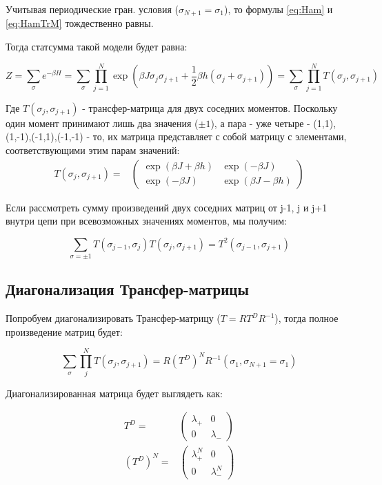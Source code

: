 \documentclass{article}
\newcommand{\bj}{\beta J}
\newcommand{\bh}{\beta h}
\newcommand{\lp}{\lambda_{+}}
\newcommand{\lm}{\lambda_{-}}
\numberwithin{equation}{section}
\begin{document}
Учитывая периодические гран. условия ($\sigma_{N+1} = \sigma_{1}$), то формулы \eqref{eq:Ham} и \eqref{eq:HamTrM} тождественно равны.

Тогда статсумма такой модели будет равна:

\begin{equation}\label{ZTrM}
    Z = \sum_{\sigma} e^{-\beta H} = \sum_{\sigma} \prod_{j=1}^{N} \exp{(\bj\sigma_{j}\sigma_{j+1} + \frac{1}{2}\bh(\sigma_{j} + \sigma_{j+1}))} = \sum_{\sigma} \prod_{j=1}^{N} T(\sigma_{j}, \sigma_{j+1})
\end{equation}
    
Где $T(\sigma_{j}, \sigma_{j+1})$ - трансфер-матрица для двух соседних моментов. Поскольку один момент принимают лишь два значения ($\pm1$), а пара - уже четыре - (1,1),(1,-1),(-1,1),(-1,-1) - то, их матрица представляет с собой матрицу с элементами, соответствующими этим парам значений:
\begin{align}\label{TrM}
  T(\sigma_{j}, \sigma_{j+1}) = &
  \begin{pmatrix}
    \exp{(\bj+\bh)} & \exp(-\bj) \\
    \exp{(-\bj)} & \exp{(\bj-\bh)}
  \end{pmatrix}  
\end{align}

Если рассмотреть сумму произведений двух соседних матриц от j-1, j и j+1 внутри цепи при всевозможных значениях моментов, мы получим:

\[\sum_{\sigma = \pm 1} T(\sigma_{j-1}, \sigma_{j})T(\sigma_{j}, \sigma_{j+1}) = T^{2}(\sigma_{j-1}, \sigma_{j+1})\]

\subsection{Диагонализация Трансфер-матрицы}

Попробуем диагонализировать Трансфер-матрицу ($ T = R T^{D} R^{-1} $), тогда полное произведение матриц будет:

\[ \sum_{\sigma}\prod_{j}^{N} T(\sigma_{j}, \sigma_{j+1}) = R (T^{D})^{N} R^{-1} (\sigma_{1},\sigma_{N+1} = \sigma_{1})\]

Диагонализированная матрица будет выглядеть как:

\begin{align}
T^{D} = &
\begin{pmatrix}\label{Td}
  \lp & 0 \\
  0 & \lm
\end{pmatrix} \\ 
(T^{D})^{N} = &
\begin{pmatrix}
  \lp^{N} & 0 \\
  0 & \lm^{N}
\end{pmatrix}
\end{align}
\end{document}
